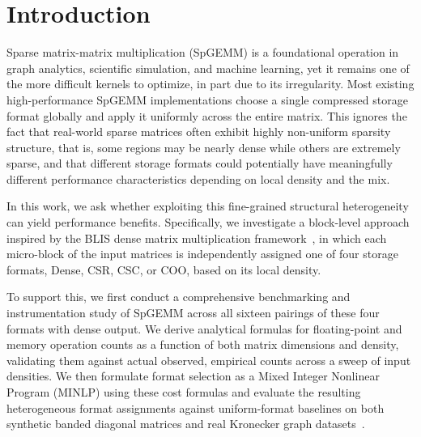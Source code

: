 \documentclass[sigconf, review, anonymous]{acmart}
\begin{document}



\maketitle

\section{Introduction}

Sparse matrix-matrix multiplication (SpGEMM) is a foundational operation in graph
analytics, scientific simulation, and machine learning, yet it remains one of the more
difficult kernels to optimize, in part due to its irregularity. Most existing high-performance
SpGEMM implementations choose a single compressed storage format globally and apply
it uniformly across the entire matrix. This ignores the fact that real-world sparse
matrices often exhibit highly non-uniform sparsity structure, that is, some regions may be
nearly dense while others are extremely sparse, and that different storage formats
could potentially have meaningfully different performance characteristics depending on
local density and the mix.

In this work, we ask whether exploiting this fine-grained structural heterogeneity can
yield performance benefits. Specifically, we investigate a block-level approach
inspired by the BLIS dense matrix multiplication framework~\cite{blis}, in which each
micro-block of the input matrices is independently assigned one of four storage
formats, Dense, CSR, CSC, or COO, based on its local density.

To support this, we first conduct a comprehensive benchmarking and instrumentation
study of SpGEMM across all sixteen pairings of these four formats with dense output.
We derive analytical formulas for floating-point and memory operation counts as a
function of both matrix dimensions and density, validating them against actual
observed, empirical counts across a sweep of input densities.
We then formulate format selection as a Mixed Integer Nonlinear Program (MINLP)
using these cost formulas and evaluate the resulting
heterogeneous format assignments against uniform-format baselines on both synthetic
banded diagonal matrices and real Kronecker graph datasets~\cite{kronecker}.
\end{document}
